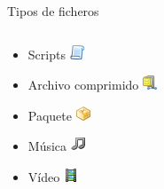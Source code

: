 \begin{frame}{Tipos de ficheros}
\begin{columns}
\begin{column}{0.5\textwidth}
\begin{itemize}
            \item Scripts \includegraphics{imgs/script.png}
            \item Archivo comprimido \includegraphics{imgs/compress.png}
            \item Paquete \includegraphics{imgs/package.png}
            \item Música \includegraphics{imgs/music.png}
            \item Vídeo \includegraphics{imgs/film.png}
        \end{itemize}
    \end{column}
    \end{columns}
\end{frame}

